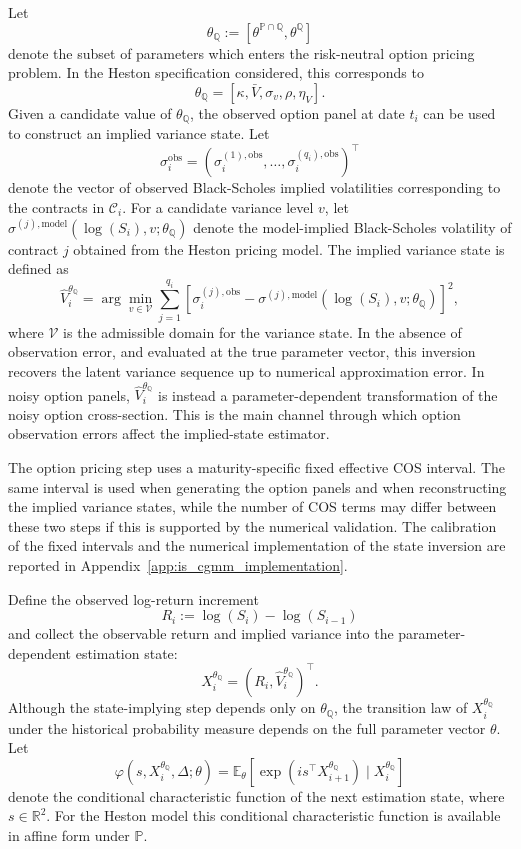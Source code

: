 \documentclass[11pt,a4paper,notitlepage]{article}
\numberwithin{equation}{section}
\begin{document}
Let
\[
\theta_{\mathbb Q}
:=
\left[
\theta^{\mathbb{P}\cap\mathbb{Q}},
\theta^\mathbb{Q}
\right]
\]
denote the subset of parameters which enters the risk-neutral option pricing problem. In the Heston specification considered, this corresponds to
\[
\theta_{\mathbb Q}
=
\left[
\kappa,\bar V,\sigma_v,\rho,\eta_V
\right].
\]
Given a candidate value of \(\theta_{\mathbb Q}\), the observed option panel at date \(t_i\) can be used to construct an implied variance state. Let
\[
\sigma_i^{\mathrm{obs}}
=
\left(
\sigma_i^{(1),\mathrm{obs}},
\dots,
\sigma_i^{(q_i),\mathrm{obs}}
\right)^\top
\]
denote the vector of observed Black-Scholes implied volatilities corresponding to the contracts in \(\mathcal C_i\). For a candidate variance level \(v\), let
\(
\sigma^{(j),\mathrm{model}}
\left(
\log(S_i),v;\theta_{\mathbb Q}
\right)
\)
denote the model-implied Black-Scholes volatility of contract \(j\) obtained from the Heston pricing model. The implied variance state is defined as
\begin{equation}
\widehat V_i^{\theta_{\mathbb Q}}
=
\arg\min_{v\in\mathcal V}
\sum_{j=1}^{q_i}
\left[
\sigma_i^{(j),\mathrm{obs}}
-
\sigma^{(j),\mathrm{model}}
\left(
\log(S_i),v;\theta_{\mathbb Q}
\right)
\right]^2 ,
\label{eq:is_implied_state}
\end{equation}
where \(\mathcal V\) is the admissible domain for the variance state. In the absence of observation error, and evaluated at the true parameter vector, this inversion recovers the latent variance sequence up to numerical approximation error. In noisy option panels, \(\widehat V_i^{\theta_{\mathbb Q}}\) is instead a parameter-dependent transformation of the noisy option cross-section. This is the main channel through which option observation errors affect the implied-state estimator.

The option pricing step uses a maturity-specific fixed effective COS interval. The same interval is used when generating the option panels and when reconstructing the implied variance states, while the number of COS terms may differ between these two steps if this is supported by the numerical validation. The calibration of the fixed intervals and the numerical implementation of the state inversion are reported in Appendix~\ref{app:is_cgmm_implementation}.

Define the observed log-return increment
\[
R_i
:=
\log(S_i)-\log(S_{i-1})
\]
and collect the observable return and implied variance into the parameter-dependent estimation state:
\[
X_i^{\theta_{\mathbb Q}}
=
\left(
R_i,
\widehat V_i^{\theta_{\mathbb Q}}
\right)^\top .
\label{eq:is_state_vector}
\]
Although the state-implying step depends only on \(\theta_{\mathbb Q}\), the transition law of \(X_i^{\theta_{\mathbb Q}}\) under the historical probability measure depends on the full parameter vector \(\theta\). Let
\[
\varphi\left(s,X_i^{\theta_{\mathbb Q}},\Delta;\theta\right)
=
\mathbb E_\theta
\left[
\exp\left(
is^\top X_{i+1}^{\theta_{\mathbb Q}}
\right)
\mid X_i^{\theta_{\mathbb Q}}
\right]
\]
denote the conditional characteristic function of the next estimation state, where \(s\in\mathbb R^2\). For the Heston model this conditional characteristic function is available in affine form under \(\mathbb P\).
\end{document}
